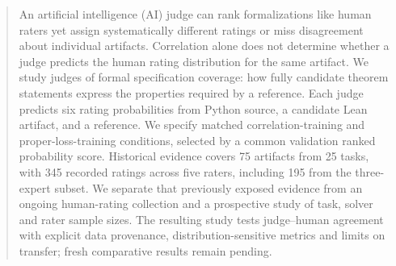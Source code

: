 \begin{abstract}
An artificial intelligence (AI) judge can rank formalizations like human raters yet assign systematically different ratings or miss disagreement about individual artifacts.
Correlation alone does not determine whether a judge predicts the human rating distribution for the same artifact.
We study judges of formal specification coverage: how fully candidate theorem statements express the properties required by a reference.
Each judge predicts six rating probabilities from Python source, a candidate Lean artifact, and a reference.
We specify matched correlation-training and proper-loss-training conditions, selected by a common validation ranked probability score.
Historical evidence covers 75 artifacts from 25 tasks, with 345 recorded ratings across five raters, including 195 from the three-expert subset.
We separate that previously exposed evidence from an ongoing human-rating collection and a prospective study of task, solver and rater sample sizes.
The resulting study tests judge--human agreement with explicit data provenance, distribution-sensitive metrics and limits on transfer; fresh comparative results remain pending.
\end{abstract}
